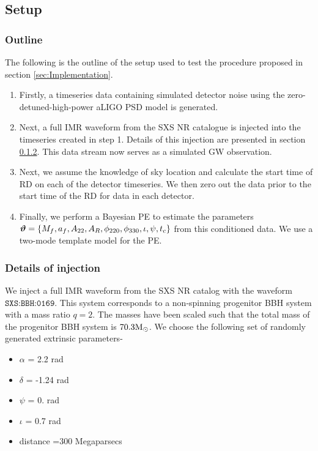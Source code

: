 \subsection{Setup}
\label{sec:setup}
\subsubsection{Outline}
The following is the outline of the setup used to test the procedure proposed in section \ref{sec:Implementation}.

\begin{enumerate}
\item Firstly, a timeseries data containing simulated detector noise using the zero-detuned-high-power aLIGO PSD model is generated.
\item Next, a full IMR waveform from the  SXS NR catalogue is injected into the timeseries created in step 1. Details of this injection are presented in section \ref{sec:injetion-detials}. This data stream now serves as a simulated GW observation. 
\item Next, we assume the knowledge of sky location and calculate the start time of RD on each of the detector timeseries. We then zero out the data prior to the start time of the RD for data in each detector. 
\item Finally, we perform a Bayesian PE  to estimate the parameters $\boldsymbol{\vartheta} = \left\lbrace M_{f}, a_{f}, A_{22}, A_{R}, \phi_{220}, \phi_{330}, \iota, \psi, t_{c}\right\rbrace$ from this conditioned data.  We use a two-mode template model for the PE. 
\end{enumerate}



\subsubsection{Details of injection}
\label{sec:injetion-detials}
We inject a full IMR waveform from the SXS NR catalog with the waveform $\texttt{SXS:BBH:0169}$. This system corresponds to a non-spinning progenitor BBH system with a mass ratio $q=2$. The masses have been scaled such that the total mass of the progenitor BBH system is $70.3 \mathrm{M}_\odot$. We choose the following set of randomly generated extrinsic parameters- 
\begin{itemize}
\item $\alpha$  = 2.2 rad
\item $\delta$ = -1.24 rad
\item $\psi$ = 0. rad
\item $\iota$  = 0.7 rad
\item distance =300 Megaparsecs
\end{itemize}


